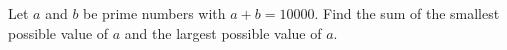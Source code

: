 Let $a$ and $b$ be prime numbers with $a+b=10000$. Find the sum of the smallest possible value of $a$ and the largest possible value of $a$.
